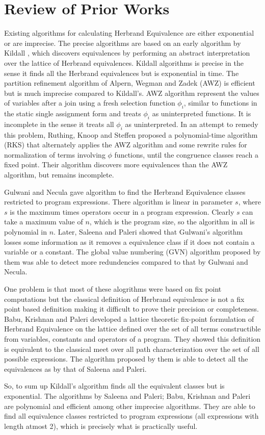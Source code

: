 \chapter{Review of Prior Works}
\label{chap:chapter2}

Existing algorithms for calculating Herbrand Equivalence are either
exponential or are imprecise. The precise algorithms are based on an 
early algorithm by Kildall \cite{Kildall}, which discovers 
equivalences by performing an abstract interpretation over the 
lattice of Herbrand equivalences. Kildall algorithms is precise in 
the sense it finds all the Herbrand equivalences but is exponential 
in time. The partition refinement algorithm of Alpern, Wegman and 
Zadek (AWZ) \cite{AWZ} is efficient but is much imprecise compared to 
Kildall's. AWZ algorithm represent the values of variables after a 
join using a fresh selection function $\phi_i$, similar to functions 
in the static single assignment form and treats $\phi_i$ as 
uninterpreted functions. It is incomplete in the sense it treats all 
$\phi_i$ as uninterpreted. In an attempt to remedy this problem, 
Ruthing, Knoop and Steffen proposed a polynomial-time algorithm (RKS) 
\cite{RKS} that alternately applies the AWZ algorithm and some 
rewrite rules for normalization of terms involving $\phi$ functions, 
until the congruence classes reach a fixed point. Their algorithm 
discovers more equivalences than the AWZ algorithm, but remains 
incomplete. 

Gulwani and Necula \cite{Gulwani} gave algorithm to find the Herbrand 
Equivalence classes restricted to program expressions. There 
algorithm is linear in parameter $s$, where $s$ is the maximum times 
operators occur in a program expression. Clearly $s$ can take a maximum 
value of $n$, which is the program size, so the algorithm in all is 
polynomial in $n$. Later, Saleena and Paleri \cite{Saleena} showed  
that Gulwani's algorithm losses some information as it removes a 
equivalence class if it does not contain a variable or a constant. 
The global value numbering (GVN) algorithm proposed by them was able 
to detect more redundencies compared to that by Gulwani and Necula.

One problem is that most of these alogrithms were based on fix point 
computations but the classical definition of Herbrand equivalence is 
not a fix point based definition making it difficult to prove their 
precision or completeness. Babu, Krishnan and Paleri \cite{Babu} 
developed a lattice theoretic fix-point formulation of Herbrand 
Equivalence on the lattice defined over the set of all terms 
constructible from variables, constants and operators of a program. 
They showed this definition is equivalent to the classical meet over 
all path characterization over the set of all possible expressions. 
The algorithm proposed by them is able to detect all the equivalences 
as by that of Saleena and Paleri.

So, to sum up Kildall's algorithm finds all the equivalent classes 
but is exponential. The algorithms by Saleena and Paleri; Babu, 
Krishnan and Paleri are polynomial and efficient among other 
imprecise algorithms. They are able to find all equivalence classes 
restricted to program expressions (all expressions with length atmost 
2), which is precisely what is practically useful.